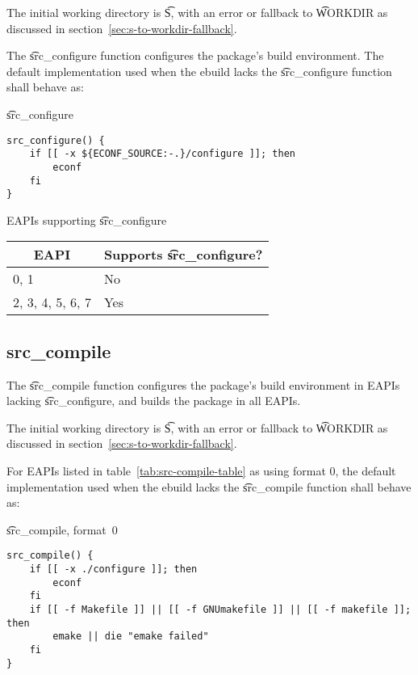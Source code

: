 The initial working directory is \t{S}, with an error or fallback to \t{WORKDIR} as discussed in
section~\ref{sec:s-to-workdir-fallback}.

The \t{src_configure} function configures the package's build environment. The default
implementation used when the ebuild lacks the \t{src_configure} function shall behave as:

\begin{listing}[H]
\caption{\t{src_configure}}
\begin{verbatim}
src_configure() {
    if [[ -x ${ECONF_SOURCE:-.}/configure ]]; then
        econf
    fi
}
\end{verbatim}
\end{listing}

\begin{centertable}{EAPIs supporting \t{src_configure}}
    \label{tab:src-configure-table}
    \begin{tabular}{ll}
      \toprule
      \multicolumn{1}{c}{\textbf{EAPI}} &
      \multicolumn{1}{c}{\textbf{Supports \t{src_configure}?}} \\
      \midrule
      0, 1              & No  \\
      2, 3, 4, 5, 6, 7  & Yes \\
      \bottomrule
    \end{tabular}
\end{centertable}

\subsection{src_compile}

 The \t{src_compile} function configures the package's build environment
in EAPIs lacking \t{src_configure}, and builds the package in all EAPIs.

The initial working directory is \t{S}, with an error or fallback to \t{WORKDIR} as discussed in
section~\ref{sec:s-to-workdir-fallback}.

 For EAPIs listed in table~\ref{tab:src-compile-table} as using format
0, the default implementation used when the ebuild lacks the \t{src_compile} function shall behave
as:

\begin{listing}[H]
\caption{\t{src_compile}, format~0}
\begin{verbatim}
src_compile() {
    if [[ -x ./configure ]]; then
        econf
    fi
    if [[ -f Makefile ]] || [[ -f GNUmakefile ]] || [[ -f makefile ]]; then
        emake || die "emake failed"
    fi
}
\end{verbatim}
\end{listing}

